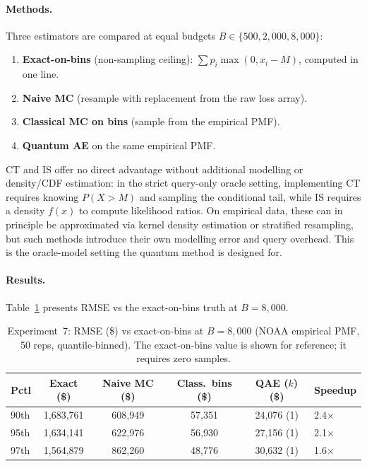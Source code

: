 \documentclass[11pt,a4paper]{article}
\begin{document}
\paragraph{Methods.} Three estimators are compared at equal budgets $B \in \{500, 2{,}000, 8{,}000\}$:

\begin{enumerate}
    \item \textbf{Exact-on-bins} (non-sampling ceiling): $\sum p_i \max(0, x_i - M)$, computed in one line.
    \item \textbf{Naive MC} (resample with replacement from the raw loss array).
    \item \textbf{Classical MC on bins} (sample from the empirical PMF).
    \item \textbf{Quantum AE} on the same empirical PMF.
\end{enumerate}

CT and IS offer no direct advantage without additional modelling or density/CDF estimation: in the strict query-only oracle setting, implementing CT requires knowing $P(X > M)$ and sampling the conditional tail, while IS requires a density $f(x)$ to compute likelihood ratios. On empirical data, these can in principle be approximated via kernel density estimation or stratified resampling, but such methods introduce their own modelling error and query overhead. This is the oracle-model setting the quantum method is designed for.

\paragraph{Results.} Table~\ref{tab:exp7} presents RMSE vs the exact-on-bins truth at $B = 8{,}000$.

\begin{table}[t]
\centering
\caption{Experiment~7: RMSE (\$) vs exact-on-bins at $B = 8{,}000$ (NOAA empirical PMF, 50 reps, quantile-binned). The exact-on-bins value is shown for reference; it requires zero samples.}
\label{tab:exp7}
\begin{tabular}{lccccl}
\toprule
Pctl & Exact (\$) & Naive MC (\$) & Class.\ bins (\$) & QAE ($k$) (\$) & Speedup \\
\midrule
90th & 1,683,761 & 608,949 & 57,351 & 24,076 (1) & 2.4$\times$ \\
95th & 1,634,141 & 622,976 & 56,930 & 27,156 (1) & 2.1$\times$ \\
97th & 1,564,879 & 862,260 & 48,776 & 30,632 (1) & 1.6$\times$ \\
\bottomrule
\end{tabular}
\end{table}
\end{document}
